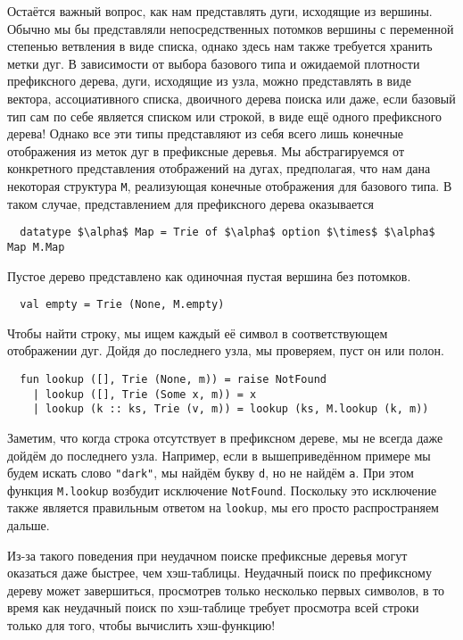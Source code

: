 Остаётся важный вопрос, как нам представлять дуги, исходящие из
вершины. Обычно мы бы представляли непосредственных потомков вершины с
переменной степенью ветвления в виде списка, однако здесь нам также
требуется хранить метки дуг. В зависимости от выбора базового типа и
ожидаемой плотности префиксного дерева, дуги, исходящие из узла, можно
представлять в виде вектора, ассоциативного списка, двоичного дерева
поиска или даже, если базовый тип сам по себе является списком или
строкой, в виде ещё одного префиксного дерева! Однако все эти типы
представляют из себя всего лишь конечные отображения из меток дуг в
префиксные деревья. Мы абстрагируемся от конкретного представления
отображений на дугах, предполагая, что нам дана некоторая
структура \lstinline!M!, реализующая конечные отображения для базового
типа. В таком случае, представлением для префиксного дерева
оказывается
\begin{lstlisting}
  datatype $\alpha$ Map = Trie of $\alpha$ option $\times$ $\alpha$ Map M.Map
\end{lstlisting}
Пустое дерево представлено как одиночная пустая вершина без потомков.
\begin{lstlisting}
  val empty = Trie (None, M.empty)
\end{lstlisting}
Чтобы найти строку, мы ищем каждый её символ в соответствующем
отображении дуг. Дойдя до последнего узла, мы проверяем, пуст он или
полон.
\begin{lstlisting}
  fun lookup ([], Trie (None, m)) = raise NotFound
    | lookup ([], Trie (Some x, m)) = x
    | lookup (k :: ks, Trie (v, m)) = lookup (ks, M.lookup (k, m))
\end{lstlisting}
Заметим, что когда строка отсутствует в префиксном дереве, мы не
всегда даже дойдём до последнего узла. Например, если в
вышеприведённом примере мы будем искать слово \lstinline!"dark"!, мы
найдём букву \texttt{d}, но не найдём \texttt{a}. При этом функция
\lstinline!M.lookup! возбудит исключение
\lstinline!NotFound!. Поскольку это исключение также является
правильным ответом на \lstinline!lookup!, мы его просто распространяем
дальше.

\begin{remark}
  Из-за такого поведения при неудачном поиске префиксные деревья могут
  оказаться даже быстрее, чем хэш-таблицы. Неудачный поиск по
  префиксному дереву может завершиться, просмотрев только несколько
  первых символов, в то время как неудачный поиск по хэш-таблице
  требует просмотра всей строки только для того, чтобы вычислить хэш-функцию!
\end{remark}

